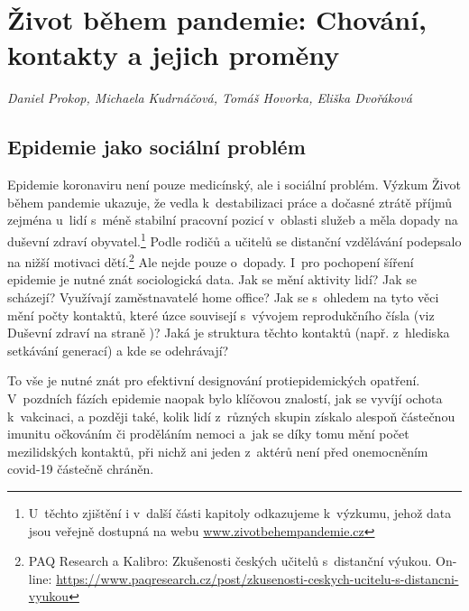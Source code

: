 \chapter[Život během pandemie: Chování a kontakty]{Život během pandemie: Chování, kontakty a jejich proměny}\label{Zmeny_chovani}

\textit{Daniel Prokop, Michaela Kudrnáčová, Tomáš Hovorka, Eliška Dvořáková}
\vspace{15mm}

\section*{Epidemie jako sociální problém}

Epidemie koronaviru není pouze medicínský, ale i sociální problém. Výzkum Život během pandemie ukazuje, že vedla k destabilizaci práce a dočasné ztrátě příjmů zejména u~lidí s méně stabilní pracovní pozicí v oblasti služeb a měla dopady na duševní zdraví obyvatel.\footnote{U těchto zjištění i v další části kapitoly odkazujeme k výzkumu, jehož data jsou veřejně dostupná na webu \url{www.zivotbehempandemie.cz}}  Podle rodičů a učitelů se distanční vzdělávání podepsalo na nižší motivaci dětí.\footnote{PAQ Research a Kalibro: Zkušenosti českých učitelů s~distanční výukou. On-line: \url{https://www.paqresearch.cz/post/zkusenosti-ceskych-ucitelu-s-distancni-vyukou}} Ale nejde pouze o~dopady. I~pro pochopení šíření epidemie je nutné znát sociologická data. Jak se mění aktivity lidí? Jak se scházejí? Využívají zaměstnavatelé home office? Jak se s ohledem na tyto věci mění počty kontaktů, které úzce souvisejí s vývojem reprodukčního čísla (viz Duševní zdraví na straně \pageref{Dusevni_zdravi})? Jaká je struktura těchto kontaktů (např. z~hlediska setkávání generací) a kde se odehrávají?

To vše je nutné znát pro efektivní designování protiepidemických opatření. V pozd\-ních fázích epidemie naopak bylo klíčovou znalostí, jak se vyvíjí ochota k vakcinaci, a později také, kolik lidí z různých skupin získalo alespoň částečnou imunitu očkováním či proděláním nemoci a jak se díky tomu mění počet mezilidských kontaktů, při nichž ani jeden z aktérů není před onemocněním covid-19 částečně chráněn.

